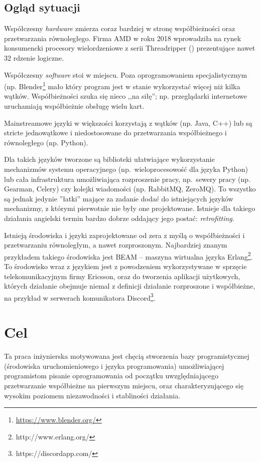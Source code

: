 \subsection{Ogląd sytuacji}

Współczesny \emph{hardware} zmierza coraz bardziej w stronę współbieżności oraz przetwarzania równoległego.
Firma AMD w roku 2018 wprowadziła na rynek konsumencki procesory wielordzeniowe z serii
Threadripper (\cite{AmdProductThreadripper}) prezentujące nawet 32 rdzenie logiczne.

Współczesny \emph{software} stoi w miejscu. Poza oprogramowaniem specjalistycznym (np.
Blender\footnote{\url{https://www.blender.org/}} mało który program jest w stanie wykorzystać więcej niż
kilka wątków. Współbieżności szuka się nieco ,,na siłę''; np. przeglądarki internetowe uruchamiają
współbieżnie obsługę wielu kart.

Mainstreamowe języki w większości korzystają z wątków (np. Java, C++) lub są stricte jednowątkowe i
niedostosowane do przetwarzania współbieżnego i równoległego (np. Python).

Dla takich języków tworzone są biblioteki ułatwiające wykorzystanie mechanizmów systemu operacyjnego
(np.~wieloprocesowość dla języka Python) lub cała infrastruktura umożliwiająca rozproszenie pracy,
np.~sewery pracy (np. Gearman, Celery) czy kolejki wiadomości (np. RabbitMQ, ZeroMQ).
To wszystko są jednak jedynie ''łatki'' mające za zadanie dodać do istniejących języków mechanizmy, z którymi
pierwotnie nie były one projektowane. Istnieje dla takiego działania angielski termin bardzo dobrze oddający
jego postać: \emph{retrofitting}.

Istnieją środowiska i języki zaprojektowane od zera z myślą o współbieżności i przetwarzaniu równoległym, a
nawet rozproszonym.
Najbardziej znanym przykładem takiego środowiska jest BEAM -- maszyna wirtualna
języka Erlang\footnote{http://www.erlang.org/}. To środowisko wraz z językiem jest z powodzeniem
wykorzystywane w sprzęcie telekomunikacyjnym firmy Ericsson, oraz do tworzenia aplikacji użytkowych, których
działanie obejmuje niemal z definicji działanie rozproszone i współbieżne, na przykład w serwerach
komunikatora Discord\footnote{https://discordapp.com/}.

\section{Cel}

Ta praca inżynierska motywowana jest chęcią stworzenia bazy programistycznej (środowiska uruchomieniowego i
języka programowania) umożliwiającej programistom pisanie oprogramowania od początku uwzględniającego
przetwarzanie współbieżne na pierwszym miejscu, oraz charakteryzującego się wysokim poziomem niezawodności i
stabliności działania.

